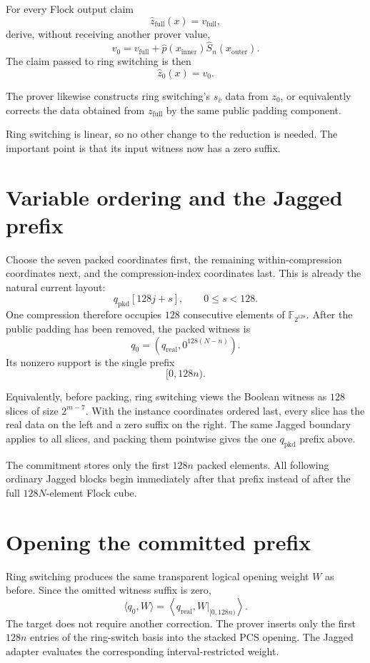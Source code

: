 \documentclass[11pt]{article}
\newcommand{\F}{\mathbb{F}_{2^{128}}}
\begin{document}
For every Flock output claim
\[
    \widehat z_{\mathrm{full}}(x)=v_{\mathrm{full}},
\]
derive, without receiving another prover value,
\[
    v_0
      =
    v_{\mathrm{full}}
      +
    \widehat p(x_{\mathrm{inner}})
    \widehat S_n(x_{\mathrm{outer}}).
\]
The claim passed to ring switching is then
\[
    \widehat z_0(x)=v_0.
\]

The prover likewise constructs ring switching's \(s_{\widehat v}\) data from
\(z_0\), or equivalently corrects the data obtained from
\(z_{\mathrm{full}}\) by the same public padding component.

Ring switching is linear, so no other change to the reduction is needed.  The
important point is that its input witness now has a zero suffix.

\section{Variable ordering and the Jagged prefix}

Choose the seven packed coordinates first, the remaining within-compression
coordinates next, and the compression-index coordinates last.  This is already
the natural current layout:
\[
    q_{\mathrm{pkd}}[128j+s],
    \qquad 0\leq s<128.
\]
One compression therefore occupies \(128\) consecutive elements of \(\F\).
After the public padding has been removed, the packed witness is
\[
    q_0=
      (q_{\mathrm{real}},
       0^{128(N-n)}).
\]
Its nonzero support is the single prefix
\[
    [0,128n).
\]

Equivalently, before packing, ring switching views the Boolean witness as
\(128\) slices of size \(2^{m-7}\).  With the instance coordinates ordered
last, every slice has the real data on the left and a zero suffix on the
right.  The same Jagged boundary applies to all slices, and packing them
pointwise gives the one \(q_{\mathrm{pkd}}\) prefix above.

The commitment stores only the first \(128n\) packed elements.  All following
ordinary Jagged blocks begin immediately after that prefix instead of after
the full \(128N\)-element Flock cube.

\section{Opening the committed prefix}

Ring switching produces the same transparent logical opening weight \(W\) as
before.  Since the omitted witness suffix is zero,
\[
    \langle q_0,W\rangle
      =
    \left\langle q_{\mathrm{real}},
      W|_{[0,128n)}\right\rangle.
\]
The target does not require another correction.  The prover inserts only the
first \(128n\) entries of the ring-switch basis into the stacked PCS opening.
The Jagged adapter evaluates the corresponding interval-restricted weight.
\end{document}
